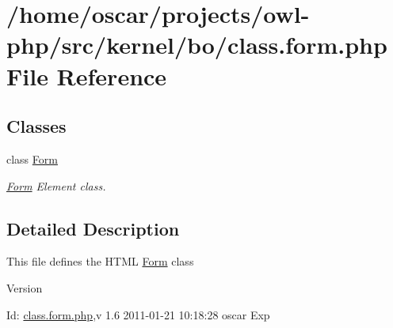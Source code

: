 \section{/home/oscar/projects/owl-\/php/src/kernel/bo/class.form.php File Reference}
\label{class_8form_8php}
\subsection*{Classes}
\begin{DoxyCompactItemize}
\item 
class \hyperlink{classForm}{Form}
\begin{DoxyCompactList}\small\item\em \hyperlink{classForm}{Form} Element class. \item\end{DoxyCompactList}\end{DoxyCompactItemize}


\subsection{Detailed Description}
This file defines the HTML \hyperlink{classForm}{Form} class \begin{DoxyVersion}{Version}

\end{DoxyVersion}
\begin{DoxyParagraph}{Id:}
\hyperlink{class_8form_8php}{class.form.php},v 1.6 2011-\/01-\/21 10:18:28 oscar Exp 
\end{DoxyParagraph}
